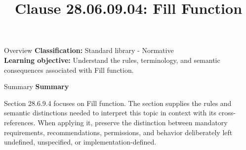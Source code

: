 \documentclass[10pt,letterpaper]{article}
\title{Clause 28.06.09.04: Fill Function}
\author{}
\date{}
\begin{document}
\maketitle
\begin{CornellOverviewBox}{Overview}
\textbf{Classification:} Standard library - Normative\\[2pt]
\textbf{Learning objective:} Understand the rules, terminology, and semantic consequences associated with Fill function.
\end{CornellOverviewBox}\begin{CornellSummaryBox}{Summary}
{\sffamily\bfseries\color{Accent} Summary}\par\vspace{3pt}Section 28.6.9.4 focuses on Fill function. The section supplies the rules and semantic distinctions needed to interpret this topic in context with its cross-references. When applying it, preserve the distinction between mandatory requirements, recommendations, permissions, and behavior deliberately left undefined, unspecified, or implementation-defined.
\end{CornellSummaryBox}
\end{document}
